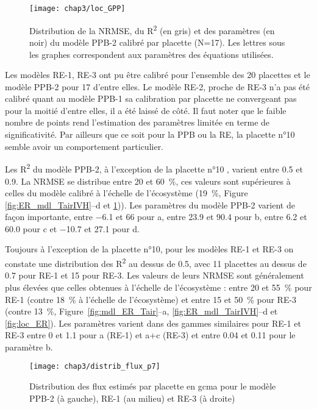\begin{figure}
\centering
\texttt{[image: chap3/loc\_GPP]}
\caption{Distribution de la NRMSE, du R\textsuperscript{2} (en gris) et des paramètres (en noir) du modèle PPB-2 calibré par placette (N=17). Les lettres sous les graphes correspondent aux paramètres des équations utilisées.}
\label{fig:loc_GPP}
\end{figure}

Les modèles RE-1, RE-3 ont pu être calibré pour l'ensemble des 20 placettes et le modèle PPB-2 pour 17 d'entre elles.
Le modèle RE-2, proche de RE-3 n'a pas été calibré quant au modèle PPB-1 sa calibration par placette ne convergeant pas pour la moitié d'entre elles, il a été laissé de côté.
Il faut noter que le faible nombre de points rend l'estimation des paramètres limitée en terme de significativité.
Par ailleurs que ce soit pour la PPB ou la RE, la placette n°10 semble avoir un comportement particulier.


Les R\textsuperscript{2} du modèle PPB-2, à l'exception de la placette n°10 , varient entre \num{0.5} et \num{0.9}.
La NRMSE se distribue entre 20 et \SI{60}{\percent}, ces valeurs sont supérieures à celles du modèle calibré à l'échelle de l'écosystème (\SI{19}{\percent}, Figure~ \ref{fig:ER_mdl_TairIVH}--d et \ref{fig:loc_GPP})).
Les paramètres du modèle PPB-2 varient de façon importante, entre \num{-6.1} et \num{66} pour a, entre \num{23.9} et \num{90.4} pour b, entre \num{6.2} et \num{60.0} pour c et \num{-10.7} et \num{27.1} pour d.

Toujours à l'exception de la placette n°10, pour les modèles RE-1 et RE-3 on constate une distribution des R\textsuperscript{2} au dessus de \num{0.5}, avec 11 placettes au dessus de \num{0.7} pour RE-1 et 15 pour RE-3.
Les valeurs de leurs NRMSE sont généralement plus élevées que celles obtenues à l'échelle de l'écosystème : entre 20 et \SI{55}{\percent} pour RE-1 (contre \SI{18}{\percent} à l'échelle de l'écosystème) et entre 15 et \SI{50}{\percent} pour RE-3 (contre \SI{13}{\percent}, Figure~\ref{fig:mdl_ER_Tair}--a, \ref{fig:ER_mdl_TairIVH}--d et \ref{fig:loc_ER}).
Les paramètres varient dans des gammes similaires pour RE-1 et RE-3 entre 0 et \num{1.1} pour a (RE-1) et a+c (RE-3) et entre \num{0.04} et \num{0.11} pour le paramètre b.


\begin{figure}
\centering
\texttt{[image: chap3/distrib\_flux\_p7]}
\caption{Distribution des flux estimés par placette en \si{gcma} pour le modèle PPB-2 (à gauche), RE-1 (au milieu) et RE-3 (à droite)}
\label{fig:distrib_fl_p7}
\end{figure}


